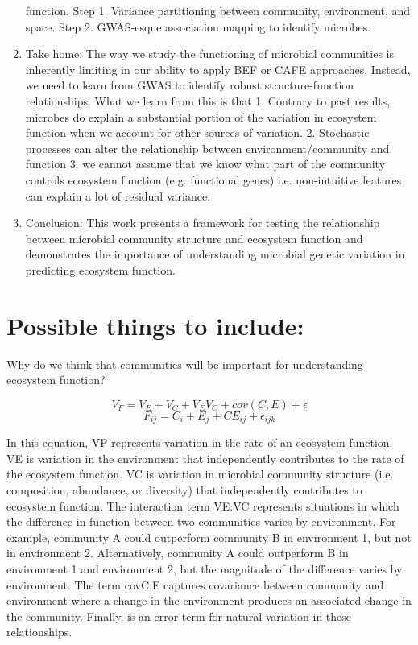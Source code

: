 \documentclass{article}
\begin{document}
\begin{enumerate}
  function. Step 1. Variance partitioning between community, environment, and
  space. Step 2. GWAS-esque association mapping to identify microbes.  
  \item Take home: The way we study the functioning of microbial communities is
  inherently limiting in our ability to apply BEF or CAFE approaches. Instead,
  we need to learn from GWAS to identify robust structure-function
  relationships. What we learn from this is that 1. Contrary to past results,
  microbes do explain a substantial portion of the variation in ecosystem
  function when we account for other sources of variation. 2. Stochastic
  processes can alter the relationship between environment/community and
  function 3.  we cannot assume that we know what part of the community controls
  ecosystem function (e.g. functional genes) i.e. non-intuitive features can
  explain a lot of residual variance.  
  \item Conclusion: This work presents a
  framework for testing the relationship between microbial community structure
  and ecosystem function and demonstrates the importance of understanding
  microbial genetic variation in predicting ecosystem function.  
  \end{enumerate}

\section*{Possible things to include:}
Why do we think that communities will be important for understanding ecosystem
function?



\begin{equation}
V_F=V_E+V_C+V_EV_C+cov(C,E)+\epsilon
\end{equation}
\begin{equation}
F_{ij}=C_i+E_j+CE_{ij}+\epsilon_{ijk}
\end{equation}

In this equation, VF represents variation in the rate of an ecosystem function.
VE is variation in the environment that independently contributes to the rate of
the ecosystem function. VC is variation in microbial community structure (i.e.
composition, abundance, or diversity) that independently contributes to
ecosystem function. The interaction term VE:VC represents situations in which
the difference in function between two communities varies by environment. For
example, community A could outperform community B in environment 1, but not in
environment 2. Alternatively, community A could outperform B in environment 1
and environment 2, but the magnitude of the difference varies by environment.
The term covC,E captures covariance between community and environment where a
change in the environment produces an associated change in the community.
Finally,  is an error term for natural variation in these relationships. 
\end{document}

